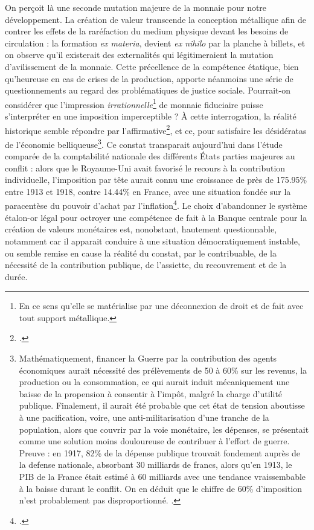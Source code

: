 { On perçoit là une seconde mutation majeure de la monnaie pour notre développement. La création de valeur transcende la conception métallique afin de contrer les effets de la raréfaction du medium physique devant les besoins de circulation : la formation \emph{ex materia}, devient \emph{ex nihilo} par la planche à billets, et on observe qu'il existerait des externalités qui légitimeraient la mutation d'\gls{avilissement} de la monnaie. Cette précellence de la compétence étatique, bien qu'heureuse en cas de crises de la production, apporte néanmoins une série de questionnements au regard des problématiques de justice sociale. Pourrait-on considérer que l'impression \emph{irrationnelle}\footnote{En ce sens qu'elle se matérialise par une déconnexion de droit et de fait avec tout support métallique.} de monnaie fiduciaire puisse s'interpréter en une imposition imperceptible ? À cette interrogation, la réalité historique semble répondre par l'affirmative\footnote{.}, et ce, pour satisfaire les désidératas de l'économie belliqueuse\footnote{Mathématiquement, financer la Guerre par la contribution des agents économiques aurait nécessité des prélèvements de 50 à 60\% sur les revenus, la production ou la consommation, ce qui aurait induit mécaniquement une baisse de la propension à consentir à l'impôt, malgré la charge d'utilité publique. Finalement, il aurait été probable que cet état de tension aboutisse à une pacification, voire, une anti-militarisation d'une tranche de la population, alors que couvrir par la voie monétaire, les dépenses, se présentait comme une solution moins douloureuse de contribuer à l'effort de guerre. Preuve : en 1917, 82\% de la dépense publique trouvait fondement auprès de la defense nationale, absorbant 30 milliards de francs, alors qu'en 1913, le \acrshort{PIB} de la France était estimé à 60 milliards avec une tendance vraissembable à la baisse durant le conflit. On en déduit que le chiffre de 60\% d'imposition n'est probablement pas disproportionné. .}. Ce constat transparait aujourd'hui dans l'étude comparée de la comptabilité nationale des différents États parties majeures au conflit : alors que le Royaume-Uni avait favorisé le recours à la contribution individuelle, l'imposition par tête aurait connu une croissance de près de 175.95\% entre 1913 et 1918, contre 14.44\% en France, avec une situation fondée sur la paracentèse du pouvoir d'achat par l'inflation\footnote{.}. Le choix d'abandonner le système étalon-or légal pour octroyer une compétence de fait à la Banque centrale pour la création de valeurs monétaires est, nonobstant, hautement questionnable, notamment car il apparait conduire à une situation démocratiquement instable, ou semble remise en cause la réalité du constat, par le contribuable, de la nécessité de la contribution publique, de l'assiette, du recouvrement et de la durée.\par
 
}
